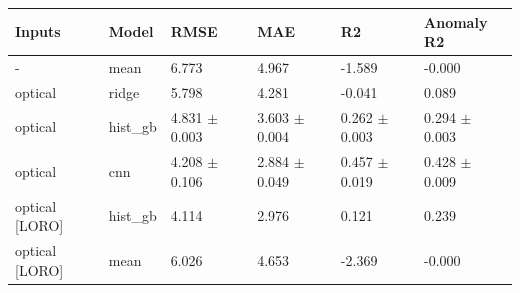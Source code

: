 \begin{tabular}{llllll}
\toprule
Inputs & Model & RMSE & MAE & R2 & Anomaly R2 \\
\midrule
- & mean & 6.773 & 4.967 & -1.589 & -0.000 \\
optical & ridge & 5.798 & 4.281 & -0.041 & 0.089 \\
optical & hist\_gb & 4.831 $\pm$ 0.003 & 3.603 $\pm$ 0.004 & 0.262 $\pm$ 0.003 & 0.294 $\pm$ 0.003 \\
optical & cnn & 4.208 $\pm$ 0.106 & 2.884 $\pm$ 0.049 & 0.457 $\pm$ 0.019 & 0.428 $\pm$ 0.009 \\
optical [LORO] & hist\_gb & 4.114 & 2.976 & 0.121 & 0.239 \\
optical [LORO] & mean & 6.026 & 4.653 & -2.369 & -0.000 \\
\bottomrule
\end{tabular}
